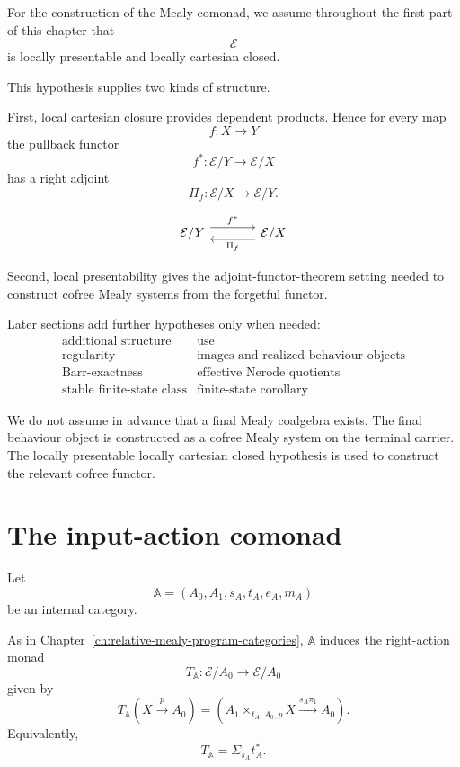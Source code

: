 For the construction of the Mealy comonad, we assume throughout the first part
of this chapter that
\[
\mathcal E
\]
is locally presentable and locally cartesian closed.

This hypothesis supplies two kinds of structure.

First, local cartesian closure provides dependent products. Hence for every
map
\[
f:X\to Y
\]
the pullback functor
\[
f^\ast:\mathcal E/Y\to\mathcal E/X
\]
has a right adjoint
\[
\Pi_f:\mathcal E/X\to\mathcal E/Y.
\]

\[
\begin{tikzcd}[column sep=large]
\mathcal E/Y
\arrow[r, shift left=1.1ex, "f^\ast"]
&
\mathcal E/X
\arrow[l, shift left=1.1ex, "\Pi_f"]
\end{tikzcd}
\]

Second, local presentability gives the adjoint-functor-theorem setting needed
to construct cofree Mealy systems from the forgetful functor.

Later sections add further hypotheses only when needed:
\[
\begin{array}{c|c}
\text{additional structure} & \text{use} \\
\hline
\text{regularity} & \text{images and realized behaviour objects} \\
\text{Barr-exactness} & \text{effective Nerode quotients} \\
\text{stable finite-state class} & \text{finite-state corollary}
\end{array}
\]

\begin{remark}
\label{rem:not-assuming-final-coalgebra}
We do not assume in advance that a final Mealy coalgebra exists. The final
behaviour object is constructed as a cofree Mealy system on the terminal
carrier. The locally presentable locally cartesian closed hypothesis is used
to construct the relevant cofree functor.
\end{remark}

\section{The input-action comonad}
\label{sec:input-action-comonad}

Let
\[
\mathbb A=(A_0,A_1,s_A,t_A,e_A,m_A)
\]
be an internal category.

As in Chapter~\ref{ch:relative-mealy-program-categories}, \(\mathbb A\)
induces the right-action monad
\[
T_{\mathbb A}:\mathcal E/A_0\to\mathcal E/A_0
\]
given by
\[
T_{\mathbb A}(X\xrightarrow{p}A_0)
=
\left(
A_1\times_{t_A,A_0,p}X
\xrightarrow{s_A\pi_1}
A_0
\right).
\]
Equivalently,
\[
T_{\mathbb A}
=
\Sigma_{s_A}t_A^\ast.
\]

